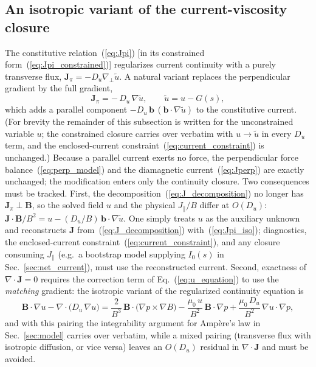 \documentclass[english]{article}
\newcommand{\bB}{\mathbf{B}}
\newcommand{\bJ}{\mathbf{J}}
\newcommand{\bb}{\mathbf{b}}
\newcommand{\gradperp}{\nabla_{\!\perp}}
\begin{document}
\subsection{An isotropic variant of the current-viscosity closure}
\label{sec:isotropic_variant}

The constitutive relation~(\ref{eq:Jpi}) [in its constrained form~(\ref{eq:Jpi_constrained})]
regularizes current continuity with a purely transverse flux, $\bJ_\pi=-D_u\gradperp\tilde u$.
A natural variant replaces the perpendicular gradient by the full gradient,
\begin{equation}
\bJ_\pi=-\,D_u\,\nabla\tilde u ,\qquad \tilde u=u-G(s),
\label{eq:Jpi_iso}
\end{equation}
which adds a parallel component $-D_u\,\bb\,(\bb\cdot\nabla\tilde u)$ to the constitutive
current. (For brevity the remainder of this subsection is written for the unconstrained
variable $u$; the constrained closure carries over verbatim with $u\rightarrow\tilde u$ in every
$D_u$ term, and the enclosed-current constraint~(\ref{eq:current_constraint}) is unchanged.) Because a parallel current exerts no force, the perpendicular force
balance~(\ref{eq:perp_model}) and the diamagnetic current~(\ref{eq:Jperp}) are exactly
unchanged; the modification enters only the continuity closure. Two consequences must be
tracked. First, the decomposition~(\ref{eq:J_decomposition}) no longer has
$\bJ_\pi\perp\bB$, so the solved field $u$ and the physical $J_\parallel/B$ differ at
$O(D_u)$: $\bJ\cdot\bB/B^{2}=u-(D_u/B)\,\bb\cdot\nabla\tilde u$. One simply treats $u$ as the
auxiliary unknown and reconstructs $\bJ$ from~(\ref{eq:J_decomposition})
with~(\ref{eq:Jpi_iso}); diagnostics, the enclosed-current constraint~(\ref{eq:current_constraint}),
and any closure consuming $J_\parallel$ (e.g.\ a bootstrap model supplying $I_0(s)$ in
Sec.~\ref{sec:net_current}), must use the reconstructed current. Second, exactness of $\nabla\cdot\bJ=0$ requires the correction term of
Eq.~(\ref{eq:u_equation}) to use the \emph{matching} gradient: the isotropic variant of
the regularized continuity equation is
\begin{equation}
\bB\cdot\nabla u-\nabla\cdot\big(D_u\,\nabla u\big)
=\frac{2}{B^{3}}\,\bB\cdot\big(\nabla p\times\nabla B\big)
-\frac{\mu_0\,u}{B^{2}}\,\bB\cdot\nabla p
+\frac{\mu_0\,D_u}{B^{2}}\,\nabla u\cdot\nabla p ,
\label{eq:u_equation_iso}
\end{equation}
and with this pairing the integrability argument for Amp\`ere's law in
Sec.~\ref{sec:model} carries over verbatim, while a mixed pairing (transverse flux with
isotropic diffusion, or vice versa) leaves an $O(D_u)$ residual in $\nabla\cdot\bJ$ and
must be avoided.
\end{document}
